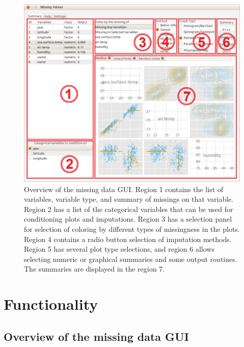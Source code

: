 \documentclass[article]{jss}
\begin{document}
\begin{center}
\begin{figure}[h]
\begin{centering}
\includegraphics[width=.9\textwidth]{graph/fig1-GUI-tab1}
\par\end{centering}
\caption{Overview of the missing data GUI. Region 1 contains the list of variables, variable type, and summary of missings on that variable. Region 2 has a list of the categorical variables that can be used for conditioning plots and imputations. Region 3 has a selection panel for selection of coloring by different types of missingness in the plots. Region 4 contains a radio button selection of imputation methods. Region 5 has several plot type selections, and region 6 allows selecting numeric or graphical summaries and some output routines. The summaries are displayed in the region 7.}
\label{fig:missingGUI}
\end{figure}
\par\end{center}

\section{Functionality}\label{Functionality}

\subsection{Overview of the missing data GUI}
\end{document}
